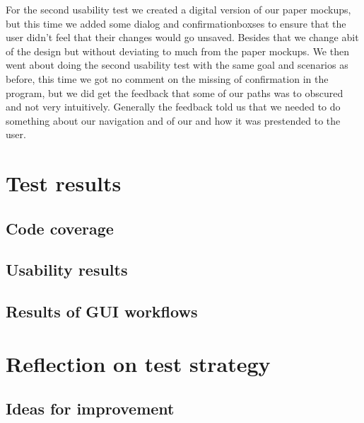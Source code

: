 For the second usability test we created a digital version of our paper mockups, but this time we added some dialog and confirmationboxses to ensure that the user didn't feel that their changes would go unsaved. Besides that we change abit of the design but without deviating to much from the paper mockups. We then went about doing the second usability test with the same goal and scenarios as before, this time we got no comment on the missing of confirmation in the program, but we did get the feedback that some of our paths was to obscured and not very intuitively. Generally the feedback told us that we needed to do something about our navigation and of our and how it was prestended to the user.


\section{Test results}
\label{Testing_Results}

\subsection{Code coverage}
\label{Testing_Results_Coverage}

\subsection{Usability results}
\label{Testing_Results_Usability}

\subsection{Results of GUI workflows}
\label{Testing_Results_Workflows}

\section{Reflection on test strategy}
\label{Testing_Reflection}

\subsection{Ideas for improvement}
\label{Testing_Reflection_improvements}

